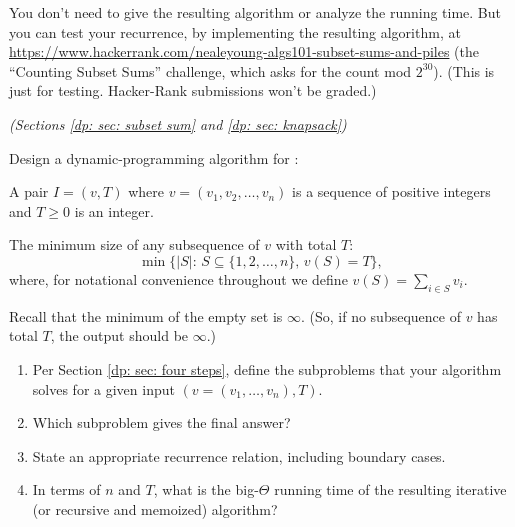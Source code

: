 \documentclass[11pt]{article}
\begin{document}
You don't need to give the resulting algorithm or analyze the running time.
But you can test your recurrence, by implementing the resulting algorithm,
at \url{https://www.hackerrank.com/nealeyoung-algs101-subset-sums-and-piles}
(the ``Counting Subset Sums'' challenge, which asks for the count mod $2^{30}$).
(This is just for testing. Hacker-Rank submissions won't be graded.)


\vfill

{}

\newpage




\problem\emph{(Sections \ref{dp: sec: subset sum} and \ref{dp: sec: knapsack})} 

Design a dynamic-programming algorithm for :
\begin{mylist}
\item[\bf input:] A pair $I=(v, T)$ where $v=(v_1,v_2, \ldots, v_n)$ is a sequence
  of positive integers and $T\ge 0$ is an integer.
\item[\bf output:]
  The minimum size of any subsequence of $v$ with total $T$:
  \[\min \big\{ |S| :\, S\subseteq\{1,2,\ldots,n\},\, v(S) = T\big\},\]
  where, for notational convenience throughout we define $v(S) = \sum_{i\in S} v_i$.
\end{mylist}
Recall that the minimum of the empty set is $\infty$.
 (So, if no subsequence of $v$ has total $T$, the output should be $\infty$.)

\begin{enumerate}[label=(\alph*)]

\item 
  Per Section \ref{dp: sec: four steps},
  define the subproblems that your algorithm solves for a given input $(v=(v_1,\ldots, v_n), T)$.

\item Which subproblem gives the final answer?

\item State an appropriate recurrence relation, including boundary cases. 

\item In terms of $n$ and $T$, what is the big-$\Theta$ running time of the resulting iterative (or recursive and memoized) algorithm?

\end{enumerate}
\end{document}
